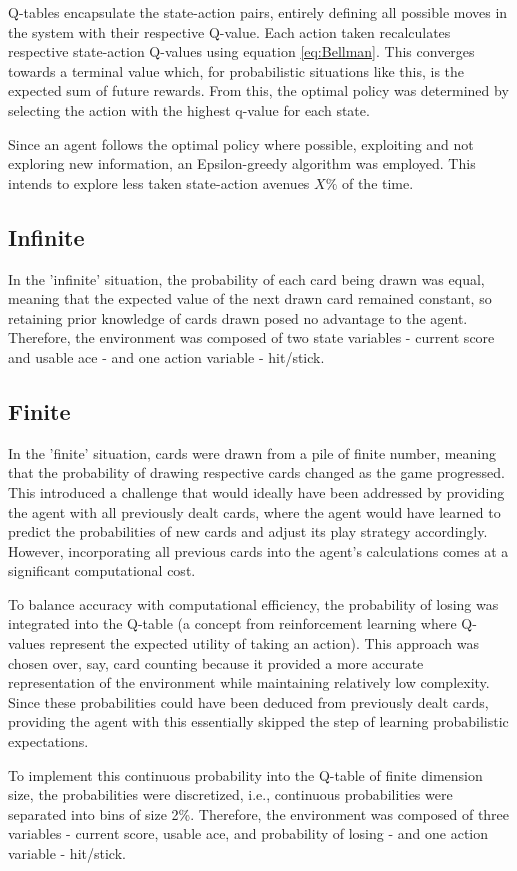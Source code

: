 \medskip
Q-tables encapsulate the state-action pairs, entirely defining all possible moves in the system with their respective Q-value. Each action taken recalculates respective state-action Q-values using equation \ref{eq:Bellman}. This converges towards a terminal value which, for probabilistic situations like this, is the expected sum of future rewards. From this, the optimal policy was determined by selecting the action with the highest q-value for each state. 


Since an agent follows the optimal policy where possible, exploiting  and not exploring new information, an Epsilon-greedy algorithm was employed. This intends to explore less taken state-action avenues \(X\%\) of the time. 

\subsection{Infinite}

In the 'infinite' situation, the probability of each card being drawn was equal, meaning that the expected value of the next drawn card remained constant, so retaining prior knowledge of cards drawn posed no advantage to the agent. Therefore, the environment was composed of two state variables - current score and usable ace - and one action variable - hit/stick.

\subsection{Finite}

In the 'finite' situation, cards were drawn from a pile of finite number, meaning that the probability of drawing respective cards changed as the game progressed. This introduced a challenge that would ideally have been addressed by providing the agent with all previously dealt cards, where the agent would have learned to predict the probabilities of new cards and adjust its play strategy accordingly. However, incorporating all previous cards into the agent's calculations comes at a significant computational cost. 

\medskip
To balance accuracy with computational efficiency, the probability of losing was integrated into the Q-table (a concept from reinforcement learning where Q-values represent the expected utility of taking an action). This approach was chosen over, say, card counting because it provided a more accurate representation of the environment while maintaining relatively low complexity. Since these probabilities could have been deduced from previously dealt cards, providing the agent with this essentially skipped the step of learning probabilistic expectations. 

\medskip
To implement this continuous probability into the Q-table of finite dimension size, the probabilities were discretized, i.e., continuous probabilities were separated into bins of size 2\%. Therefore, the environment was composed of three variables - current score, usable ace, and probability of losing - and one action variable - hit/stick. 